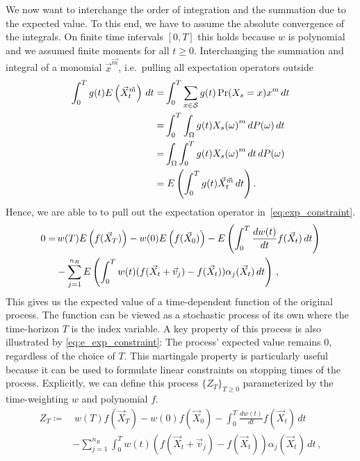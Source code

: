 We now want to interchange the order of integration and the summation due to the expected value.
To this end, we have to assume the absolute convergence of the integrals.
On finite time intervals $[0,T]$ this holds because $w$
is polynomial and we assumed finite moments for all $t\geq 0$.
Interchanging the  summation  and integral of a monomial
${\vec{x}}^{\vec{m}}$, i.e.\ pulling all expectation operators outside
\begin{equation*}
\begin{split}
\int_{0}^Tg(t){E}\left(\vec X_t^{\vec m}\right)\,dt
 =&\int_{0}^T\sum_{x\in\mathcal{S}}g(t)\Pr(X_s=x)x^m\,dt\\
 =&\int_{0}^T\int_{\Omega} g(t) {X_s(\omega)}^m\,dP(\omega)\,dt\\
 =&\int_{\Omega}\int_{0}^T g(t) {X_s(\omega)}^m\,dt\,dP(\omega)\\
=&\;{E}\left(\int_{0}^Tg(t){\vec X}_t^{\vec m}\,dt\right).
\end{split}
\end{equation*}
Hence, we are able to to pull out the expectation operator in~\eqref{eq:exp_constraint}.
\begin{equation}\label{eq:e_exp_constraint}
\begin{split}
    0=&\,w(T){E}\left(f(\vec X_T)\right) - w(0){E}\left(f(\vec X_{0})\right) -
    {E}\left(\int_{0}^T\frac{dw(t)}{dt}f(\vec X_t)\,dt\right)\\
    &-\sum_{j=1}^{n_R}{E}\left(\int_{0}^Tw(t)
         (f(\vec X_t+\vec v_j) - f(\vec X_t))\alpha_j(\vec X_t)\,dt\right)\,,
         \end{split}
\end{equation}
This gives us the expected value of a time-dependent function of the original process.
The function can be viewed as a stochastic process of its own where the
time-horizon $T$ is the index variable. A key property
of this process is also illustrated by \eqref{eq:e_exp_constraint}: The process'
expected value remains 0, regardless of the choice of $T$.
This martingale property is particularly useful because it can be used
to formulate linear constraints on stopping times of the process.
Explicitly, we can define this process $\{Z_T\}_{T\geq 0}$ parameterized by
the time-weighting $w$ and polynomial $f$.
\begin{equation}\label{eq:martingale}
\begin{split}
    Z_T\coloneqq&\,w(T)f(\vec X_T) - w(0)f(\vec X_{0}) -
    \int_{0}^T\frac{dw(t)}{dt}f(\vec X_t)\,dt\\
    &-\sum_{j=1}^{n_R}\int_{0}^Tw(t)
         (f(\vec X_t+\vec v_j) - f(\vec X_t))\alpha_j(\vec X_t)\,dt\,,
         \end{split}
\end{equation}
